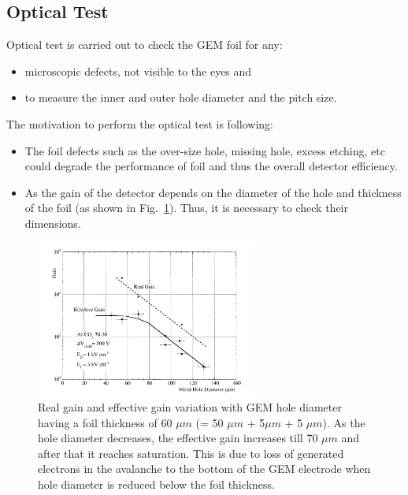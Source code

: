 \subsection{Optical Test} %
\label{sub:optical_test}
Optical test is carried out to check the GEM foil for any:
\begin{itemize}
    \item microscopic defects, not visible to the eyes and
    \item to measure the inner and outer hole diameter and the pitch size.
\end{itemize}
The motivation to perform the optical test is following:
\begin{itemize}
    \item The foil defects such as the over-size hole, missing hole, excess etching, etc could degrade the performance of foil and thus the overall detector efficiency.
    \item As the gain of the detector depends on the diameter of the hole and thickness of the foil (as shown in Fig.~\ref{fig:gain-vs-holediameter}).
    Thus, it is necessary to check their dimensions.
\end{itemize}
\begin{figure}[htbp]
    \centering
    \includegraphics[width=0.65\textwidth]{figures/GEM/Gain_Vs_Hole_Diameter.pdf}
    \caption{Real gain and effective gain variation with GEM hole diameter~\cite{Bachmann1999} having a foil thickness of 60 $\mu m$ (= 50 $\mu m$ + 5$ \mu m$ + 5 $\mu m$). As the hole diameter decreases, the effective gain increases till 70 $\mu m$ and after that it reaches saturation. This is due to loss of generated electrons in the avalanche to the bottom of the GEM electrode when hole diameter is reduced below the foil thickness.}
    \label{fig:gain-vs-holediameter}
\end{figure}
